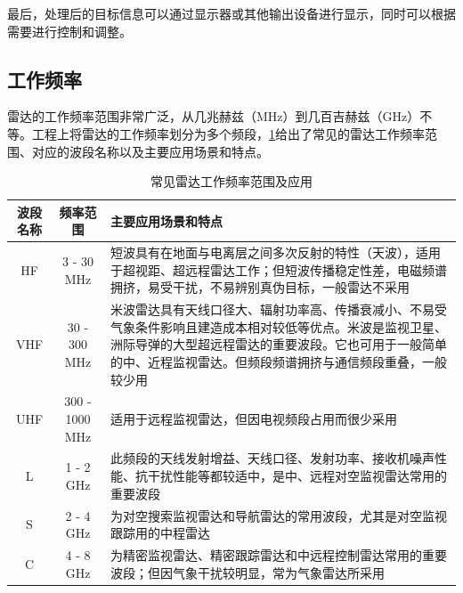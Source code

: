 最后，处理后的目标信息可以通过显示器或其他输出设备进行显示，同时可以根据需要进行控制和调整。

\subsection{工作频率}

雷达的工作频率范围非常广泛，从几兆赫兹（MHz）到几百吉赫兹（GHz）不等。工程上将雷达的工作频率划分为多个频段，\cref{tab_chp1_radar_frequency}给出了常见的雷达工作频率范围、对应的波段名称以及主要应用场景和特点。

\begin{table}[htb!]
    \centering
    \caption{常见雷达工作频率范围及应用}
    \label{tab_chp1_radar_frequency}
    \small
    \begin{tabular}{c|c|p{7cm}}
        \hline
        波段名称 & 频率范围           & 主要应用场景和特点                                                                                                       \\
        \hline
        \hline
        HF   & 3 - 30 MHz     & 短波具有在地面与电离层之间多次反射的特性（天波），适用于超视距、超远程雷达工作；但短波传播稳定性差，电磁频谱拥挤，易受干扰，不易辨别真伪目标，一般雷达不采用
        \\
        \hline
        VHF  & 30 - 300 MHz   & 米波雷达具有天线口径大、辐射功率高、传播衰减小、不易受气象条件影响且建造成本相对较低等优点。米波是监视卫星、洲际导弹的大型超远程雷达的重要波段。它也可用于一般简单的中、近程监视雷达。但频段频谱拥挤与通信频段重叠，一般较少用 \\ \hline
        UHF  & 300 - 1000 MHz & 适用于远程监视雷达，但因电视频段占用而很少采用                                                                                         \\
        \hline
        L    & 1 - 2 GHz      & 此频段的天线发射增益、天线口径、发射功率、接收机噪声性能、抗干扰性能等都较适中，是中、远程对空监视雷达常用的重要波段                                                      \\
        \hline
        S    & 2 - 4 GHz      & 为对空搜索监视雷达和导航雷达的常用波段，尤其是对空监视跟踪用的中程雷达                                                                             \\
        \hline
        C    & 4 - 8 GHz      & 为精密监视雷达、精密跟踪雷达和中远程控制雷达常用的重要波段；但因气象干扰较明显，常为气象雷达所采用                                                               \\

\end{tabular}
\end{table}
